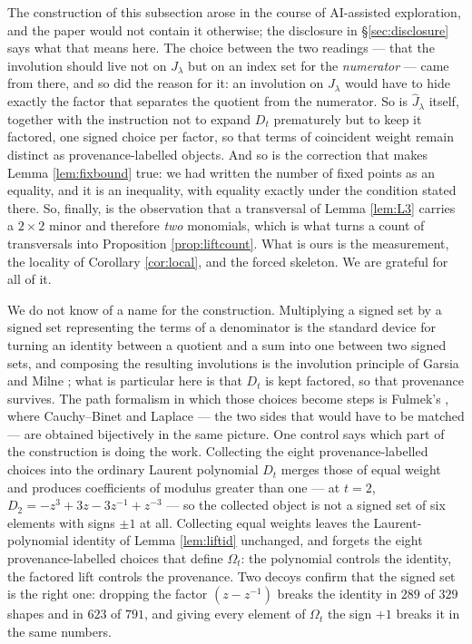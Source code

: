 \documentclass[11pt,reqno]{amsart}
\theoremstyle{plain}
\theoremstyle{definition}
\begin{document}
The construction of this subsection arose in the course of AI-assisted exploration, and the paper
would not contain it otherwise; the disclosure in \S\ref{sec:disclosure} says what that means here.
The choice between the two readings --- that the involution should live not on
$J_\lambda$ but on an index set for the \emph{numerator} --- came from there, and so did the reason
for it:
an involution on $J_\lambda$ would have to hide exactly the factor that separates the quotient from
the numerator. So is $\widehat J_\lambda$ itself, together with the instruction not to expand $D_t$
prematurely but to keep it factored, one signed choice per factor, so that terms of coincident weight
remain distinct as provenance-labelled objects. And so is the correction that makes Lemma \ref{lem:fixbound} true: we
had written the number of fixed points as an equality, and it is an inequality, with equality exactly
under the condition stated there. So, finally, is the observation that a transversal of Lemma
\ref{lem:L3} carries a $2\times2$ minor and therefore \emph{two} monomials, which is what turns a
count of transversals into Proposition \ref{prop:liftcount}. What is ours is the measurement, the
locality of Corollary \ref{cor:local}, and the forced skeleton. We are grateful for all of it.

We do not know of a name for the construction. Multiplying a signed set by a signed set representing
the terms of a denominator is the standard device for turning an identity between a quotient and a
sum into one between two signed sets, and composing the resulting involutions is the involution
principle of Garsia and Milne \cite{GM81}; what is particular here is that $D_t$ is kept factored, so
that provenance survives. The path formalism in which those choices become steps is Fulmek's
\cite{Fulmek}, where Cauchy--Binet and Laplace --- the two sides that would have to be matched ---
are obtained bijectively in the same picture. One control says which part of the construction is
doing the work. Collecting the eight provenance-labelled choices into the ordinary Laurent polynomial
$D_t$ merges those of equal weight and produces coefficients of modulus greater than one --- at
$t=2$, $D_2=-z^3+3z-3z^{-1}+z^{-3}$ --- so the collected object is not a signed set of six elements
with signs $\pm1$ at all. Collecting equal weights leaves the Laurent-polynomial identity of Lemma
\ref{lem:liftid} unchanged, and forgets the eight provenance-labelled choices that define
$\Omega_t$: the polynomial controls the identity, the factored lift controls the provenance. Two decoys confirm
that the signed set is the right one: dropping the factor $(z-z^{-1})$ breaks the identity in $289$
of $329$ shapes and in $623$ of $791$, and giving every element of $\Omega_t$ the sign $+1$ breaks it
in the same numbers.
\end{document}
